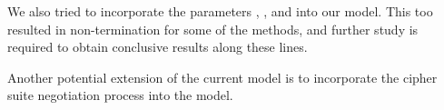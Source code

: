 \documentclass[runningheads, envcountsame, a4paper, draft, x11names]{llncs}
\begin{document}
We also tried to incorporate the parameters \mCi, \mCr, and \mAD{} into our model. This too resulted in non-termination for some of the methods, and further study is required to obtain conclusive results along these lines. 

Another potential extension of the current model is to incorporate the cipher suite negotiation process into the model.\\ 
%




%
% 
\end{document}
